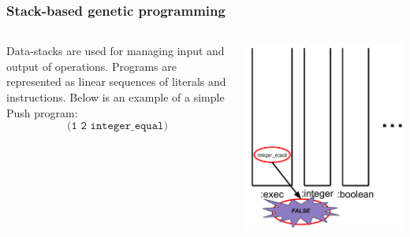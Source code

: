 \documentclass{beamer}
\newcommand{\linespace}{\vskip 0.25cm}
\begin{document}
\begin{frame}
	\frametitle{Stack-based genetic programming}
	\begin{columns}
		\begin{column}{0.6\textwidth}
			Data-stacks are used for managing input and output of operations.
			\linespace
			\linespace
			\linespace
			Programs are represented as linear sequences of literals and instructions. Below is an example of a simple Push program:
			\[\texttt{(1 2 integer\_equal)}\]
		\end{column}
		\begin{column}{0.4\textwidth}
			\includegraphics[height=1.2\textwidth]{Illustrations/stack_9.PDF}
		\end{column}
	\end{columns}
\end{frame}
\end{document}
